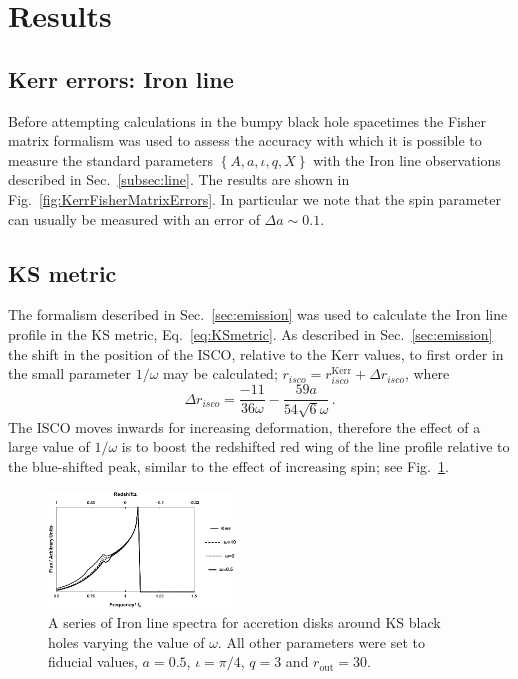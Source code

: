 \section{Results}\label{sec:results}
\subsection{Kerr errors: Iron line}\label{subsubsec:kerrres}
Before attempting calculations in the bumpy black hole spacetimes the Fisher matrix formalism was used to assess the accuracy with which it is possible to measure the standard parameters $\left\{A,a,\iota,q,X\right\}$ with the Iron line observations described in Sec.\ \ref{subsec:line}. The results are shown in Fig.\ \ref{fig:KerrFisherMatrixErrors}. In particular we note that the spin parameter can usually be measured with an error of $\Delta a\sim 0.1$.

\subsection{KS metric}\label{subsubsec:KSres}
The formalism described in Sec.\ \ref{sec:emission} was used to calculate the Iron line profile in the KS metric, Eq.\ \ref{eq:KSmetric}. As described in Sec.\ \ref{sec:emission} the shift in the position of the ISCO, relative to the Kerr values, to first order in the small parameter $1/\omega$ may be calculated; $r_{isco}=r_{isco}^{\textrm{Kerr}}+\Delta r_{isco}$, where 
\begin{equation} \Delta r_{isco}=\frac{-11}{36\omega}-\frac{59a}{54\sqrt{6}\omega}\, .  \end{equation}
The ISCO moves inwards for increasing deformation, therefore the effect of a large value of $1/\omega$ is to boost the redshifted red wing of the line profile relative to the blue-shifted peak, similar to the effect of increasing spin; see Fig.\ \ref{fig:KSIronLines}. 

\begin{figure}[h]
 \centering
 \includegraphics[trim=0cm 0cm 0cm 0cm, width=0.45\textwidth]{KSIronLines.pdf}
 \caption{A series of Iron line spectra for accretion disks around KS black holes varying the value of $\omega$. All other parameters were set to fiducial values, $a=0.5$, $\iota=\pi/4$, $q=3$ and $r_{\textrm{out}}=30$.}
 \label{fig:KSIronLines}
\end{figure}


